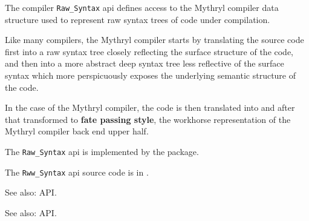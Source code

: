
The compiler {\tt Raw\_Syntax} api defines access to the Mythryl compiler data structure 
used to represent raw syntax trees of code under compilation.

Like many compilers, the Mythryl compiler starts by translating the 
source code first into a raw syntax tree closely reflecting the 
surface structure of the code, and then into a more abstract deep 
syntax tree less reflective of the surface syntax which more 
perspicuously exposes the underlying semantic structure of the code.

In the case of the Mythryl compiler, the code is then translated into 
 and after that transformed to 
{\bf fate passing style}, the workhorse representation of the 
Mythryl compiler back end upper half.

The {\tt Raw\_Syntax} api is implemented by the  package.

The {\tt Rww\_Syntax} api source code is in .

See also:   API.

See also:   API.


